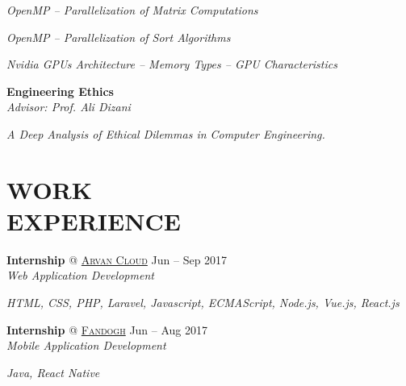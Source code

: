 \documentclass[margin, 10pt]{res} %
\begin{document}
\begin{resume}
\begin{innerlist}
				\item \textit{OpenMP -- Parallelization of Matrix Computations} \href{https://github.com/aligholamee/Parallax/raw/master/docs/assignment-2/MCP_9531504_HW2.pdf}{\hfill\UrlFont[docs]}
				
				\item \textit{OpenMP -- Parallelization of Sort Algorithms} \href{https://github.com/aligholamee/Parallax/raw/master/docs/assignment-3/MCP_9531504_HW3.pdf}{\hfill\UrlFont[docs]}

				\item \textit{Nvidia GPUs Architecture -- Memory Types -- GPU Characteristics} \href{https://github.com/aligholamee/Parallax/raw/master/docs/assignment-4/MCP_9531504_HW4.pdf}{\hfill\UrlFont[docs]}
				
			\end{innerlist}

        \textbf{Engineering Ethics}\\
		\textit{Advisor: Prof. Ali Dizani}
		\begin{innerlist}
			\item \textit{A Deep Analysis of Ethical Dilemmas in Computer Engineering.} \href{https://www.dropbox.com/s/hysshvi811nqwm4/Release_1_0_0.pdf?dl=0}{\hfill\UrlFont[docs]}
			
		\end{innerlist}
		
    
    \section{WORK \\ EXPERIENCE}
	\textbf{Internship} \textsc{@}
	\href{https://www.arvancloud.com/}{\textsc{Arvan Cloud}}
	\hfill {Jun -- Sep 2017}\\
	\textit{Web Application Development}
	\begin{innerlist}
		\item \textit{HTML, CSS, PHP, Laravel, Javascript, ECMAScript, Node.js, Vue.js, React.js}
	\end{innerlist}
	
	\textbf{Internship} \textsc{@}
	\href{http://www.fandogh.org/}{\textsc{Fandogh}}
	\hfill {Jun -- Aug 2017}\\
	\textit{Mobile Application Development}
	\begin{innerlist}
		\item \textit{Java, React Native}
	\end{innerlist}


\end{resume}
\end{document}
